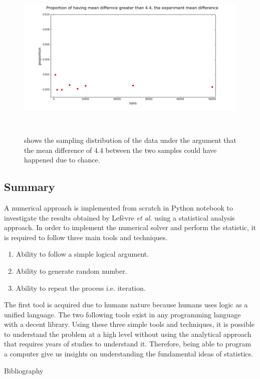 \begin{figure}[t]
\centerline{\includegraphics[height=8cm,width=16cm]{./Figures/proportion}}
\caption{shows the sampling distribution of the data under the argument that the mean difference of 4.4 between the two samples could have happened due to chance. \label{prop_0}}
\end{figure}

\subsection{Summary}
A numerical approach is implemented from scratch in Python notebook to investigate the results obtained by Lef\`evre \textit{et al.} using a statistical analysis approach. In order to implement the numerical solver and perform the statistic, it is required to follow three main tools and techniques.
\begin{enumerate}
  \item Ability to follow a simple logical argument.
  \item Ability to generate random number.
  \item Ability to repeat the process i.e. iteration.
\end{enumerate}
The first tool is acquired due to humans nature because humans uses logic as a unified language. The two following tools exist in any programming language with a decent library. Using these three simple tools and techniques, it is possible to understand the problem at a high level without using the analytical approach that requires years of studies to understand it. Therefore, being able to program a computer give us insights on understanding the fundamental ideas of statistics.

\newpage



\cleardoublepage

 {Bibliography}








